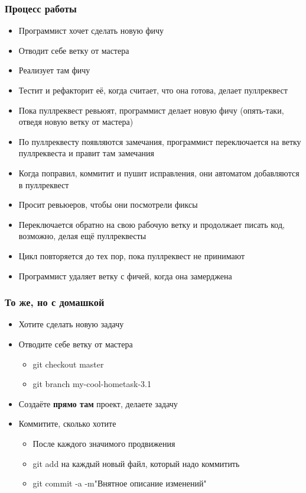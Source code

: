 \documentclass[xetex,mathserif,serif]{beamer}
\begin{document}
	\begin{frame}
		\frametitle{Процесс работы}
		\begin{footnotesize}
			\begin{itemize}
				\item Программист хочет сделать новую фичу
				\item Отводит себе ветку от мастера
				\item Реализует там фичу
				\item Тестит и рефакторит её, когда считает, что она готова, делает пуллреквест
				\item Пока пуллреквест ревьюят, программист делает новую фичу (опять-таки, отведя новую ветку от мастера)
				\item По пуллреквесту появляются замечания, программист переключается на ветку пуллреквеста и правит там замечания
				\item Когда поправил, коммитит и пушит исправления, они автоматом добавляются в пуллреквест
				\item Просит ревьюеров, чтобы они посмотрели фиксы
				\item Переключается обратно на свою рабочую ветку и продолжает писать код, возможно, делая ещё пуллреквесты 
				\item Цикл повторяется до тех пор, пока пуллреквест не принимают
				\item Программист удаляет ветку с фичей, когда она замерджена
			\end{itemize}
		\end{footnotesize}
	\end{frame}

	\begin{frame}
		\frametitle{То же, но с домашкой}
		\begin{itemize}
			\item Хотите сделать новую задачу
			\item Отводите себе ветку от мастера
			\begin{itemize}
				\item git checkout master
				\item git branch my-cool-hometask-3.1
			\end{itemize}
			\item Создаёте \textbf{прямо там} проект, делаете задачу
			\item Коммитите, сколько хотите
			\begin{itemize}
				\item После каждого значимого продвижения
				\item git add на каждый новый файл, который надо коммитить
				\item git commit -a -m"Внятное описание изменений"
			\end{itemize}
		\end{itemize}
	\end{frame}
\end{document}
